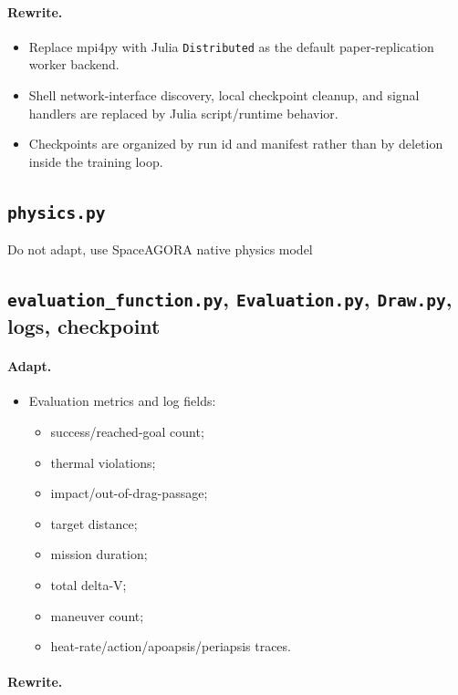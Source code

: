 \documentclass[11pt]{article}
\begin{document}
\paragraph{Rewrite.}

\begin{itemize}
\item Replace mpi4py with Julia \texttt{Distributed} as the default paper-replication worker backend.
\item Shell network-interface discovery, local checkpoint cleanup, and signal handlers are replaced by Julia script/runtime behavior.
\item Checkpoints are organized by run id and manifest rather than by deletion inside the training loop.
\end{itemize}


\subsection{\texttt{physics.py}}

Do not adapt, use SpaceAGORA native physics model


\subsection{\texttt{evaluation\_function.py}, \texttt{Evaluation.py}, \texttt{Draw.py}, logs, checkpoint}

\paragraph{Adapt.}

\begin{itemize}
\item Evaluation metrics and log fields:
\begin{itemize}
\item success/reached-goal count;
\item thermal violations;
\item impact/out-of-drag-passage;
\item target distance;
\item mission duration;
\item total delta-V;
\item maneuver count;
\item heat-rate/action/apoapsis/periapsis traces.
\end{itemize}
\end{itemize}

\paragraph{Rewrite.}
\end{document}
